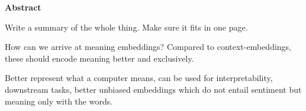 \newpage
{\Huge \bf Abstract}
\vspace{24pt} 


Write a summary of the whole thing. Make 
sure it fits in one page. 

How can we arrive at meaning embeddings?
Compared to context-embeddings, these should encode meaning better and exclusively.

Better represent what a computer means, can be used for interpretability, downstream tasks, better unbiased embeddings which do not entail sentiment but meaning only with the words.


\newpage
\vspace*{\fill}
